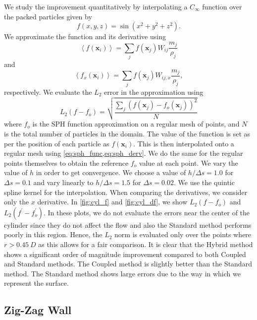 \documentclass[preprint,12pt]{elsarticle}
\newcommand{\ten}[1]{\ensuremath{\mathbf{#1}}}
\begin{document}
We study the improvement quantitatively by interpolating a $C_{\infty}$
function over the packed particles given by
\begin{equation}
  f(x, y, z) = \sin(x^{2} + y^{2} + z^{2}).
\end{equation}
We approximate the function and its derivative using
\begin{equation}
  \left<f(\ten{x}_i)\right> = \sum_j f(\ten{x}_j) W_{ij} \frac{m_j}{\rho_{j}}
  \label{eq:sph_func}
\end{equation}
and
\begin{equation}
  \left<f_{x}(\ten{x}_i)\right> = \sum_j f(\ten{x}_j) W_{ij, x} \frac{m_j}{\rho_{j}},
  \label{eq:sph_derv}
\end{equation}
respectively. We evaluate the $L_2$ error in the approximation using
\begin{equation}
  L_2(f-f_{o}) = \sqrt{\frac{\sum_j (f(\ten{x}_j) - f_{o}(\ten{x}_j))^{2}}{N}}
  \label{eq:l2}
\end{equation}
where $f_o$ is the SPH function approximation on a regular mesh of points, and
$N$ is the total number of particles in the domain. The value of the function
is set as per the position of each particle as $f(\ten{x}_i)$. This is then
interpolated onto a regular mesh using \cref{eq:sph_func,eq:sph_derv}. We do
the same for the regular points themselves to obtain the reference $f_o$ value
at each point. We vary the value of $h$ in order to get convergence. We choose
a value of $h/\Delta s=1.0$ for $\Delta s = 0.1$ and vary linearly to
$h/\Delta s=1.5$ for $\Delta s =0.02$. We use the quintic spline kernel for
the interpolation. When comparing the derivatives, we consider only the $x$
derivative. In \cref{fig:cyl_f} and \cref{fig:cyl_df}, we show $L_{2}(f -
f_{o})$ and $L_{2}(f^{\prime} - f_{o}^{\prime})$. In these plots, we do not
evaluate the errors near the center of the cylinder since they do not affect
the flow and also the Standard method performs poorly in this region. Hence,
the $L_2$ norm is evaluated only over the points where $r>0.45 \ D$ as this
allows for a fair comparison. It is clear that the Hybrid method shows a
significant order of magnitude improvement compared to both Coupled and
Standard methods. The Coupled method is slightly better than the Standard
method. The Standard method shows large errors due to the way in which we
represent the surface.

\subsection{Zig-Zag Wall}
\end{document}
